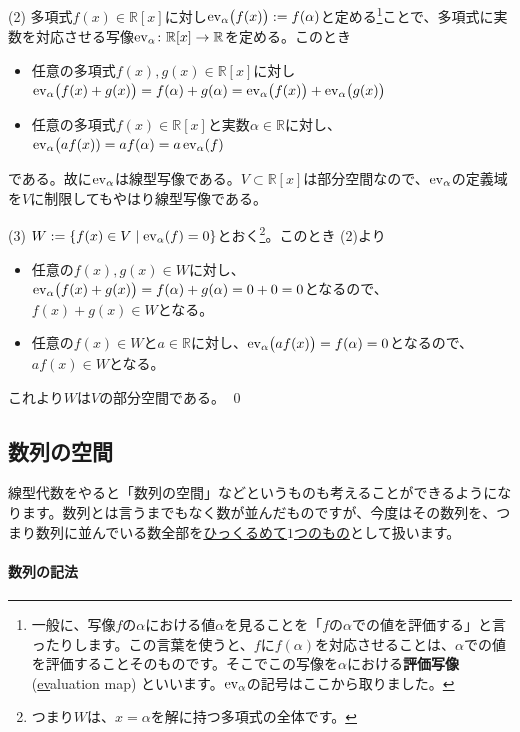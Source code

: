 \noindent (2) 多項式$f(x)\in\mathbb{R}[x]$に対し$\operatorname{ev}_{\alpha}\bigl(f(x)\bigr) := f(\alpha)$と定める\footnote{\label{footnote:evaluation_map}一般に、写像$f$の$\alpha$における値$\alpha$を見ることを「$f$の$\alpha$での値を評価する」と言ったりします。この言葉を使うと、$f$に$f(\alpha)$を対応させることは、$\alpha$での値を評価することそのものです。そこでこの写像を$\alpha$における\textbf{評価写像} (\underline{ev}aluation map) といいます。$\operatorname{ev}_{\alpha}$の記号はここから取りました。}ことで、多項式に実数を対応させる写像$\operatorname{ev}_{\alpha}\colon\mathbb{R}[x]\rightarrow\mathbb{R}$を定める。このとき
\begin{itemize}
\item 任意の多項式$f(x), g(x) \in\mathbb{R}[x]$に対し$\operatorname{ev}_{\alpha}\bigl(f(x)+g(x)\bigr) = f(\alpha) + g(\alpha) = \operatorname{ev}_{\alpha}\bigl(f(x)\bigr) + \operatorname{ev}_{\alpha}\bigl(g(x)\bigr)$
\item 任意の多項式$f(x)\in\mathbb{R}[x]$と実数$\alpha\in\mathbb{R}$に対し、$\operatorname{ev}_{\alpha}\bigl(af(x)) = a f(\alpha) = a \operatorname{ev}_{\alpha}(f)$
\end{itemize}
である。故に$\operatorname{ev}_{\alpha}$は線型写像である。$V\subset\mathbb{R}[x]$は部分空間なので、$\operatorname{ev}_{\alpha}$の定義域を$V$に制限してもやはり線型写像である。

\noindent (3) $W := \{f(x) \in V \mid \operatorname{ev}_{\alpha}(f) = 0\}$とおく\footnote{つまり$W$は、$x = \alpha$を解に持つ多項式の全体です。}。このとき (2)より
\begin{itemize}
\item 任意の$f(x), g(x)\in W$に対し、$\operatorname{ev}_{\alpha}\bigl(f(x) + g(x)\bigr) = f(\alpha) + g(\alpha) = 0 + 0 = 0$となるので、$f(x) + g(x) \in W$となる。
\item 任意の$f(x) \in W$と$a\in\mathbb{R}$に対し、$\operatorname{ev}_{\alpha}\bigl(a f(x)\bigr) = f(\alpha) = 0$となるので、$af(x)\in W$となる。
\end{itemize}
これより$W$は$V$の部分空間である。 \qed

\subsection{数列の空間}

線型代数をやると「数列の空間」などというものも考えることができるようになります。数列とは言うまでもなく数が並んだものですが、今度はその数列を、つまり数列に並んでいる数全部を\uline{ひっくるめて$1$つのもの}として扱います。

\paragraph{数列の記法}

